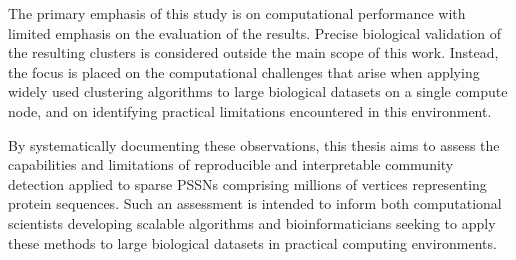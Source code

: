 The primary emphasis of this study is on computational performance with limited
emphasis on the evaluation of the results. Precise biological validation of the
resulting clusters is considered outside the main scope of this work. Instead,
the focus is placed on the computational challenges that arise when applying
widely used clustering algorithms to large biological datasets on a single
compute node, and on identifying practical limitations encountered in this
environment.

By systematically documenting these observations, this thesis aims to assess
the capabilities and limitations of reproducible and interpretable community
detection applied to sparse PSSNs comprising millions of vertices representing
protein sequences. Such an assessment is intended to inform both computational
scientists developing scalable algorithms and bioinformaticians seeking to
apply these methods to large biological datasets in practical computing
environments.
